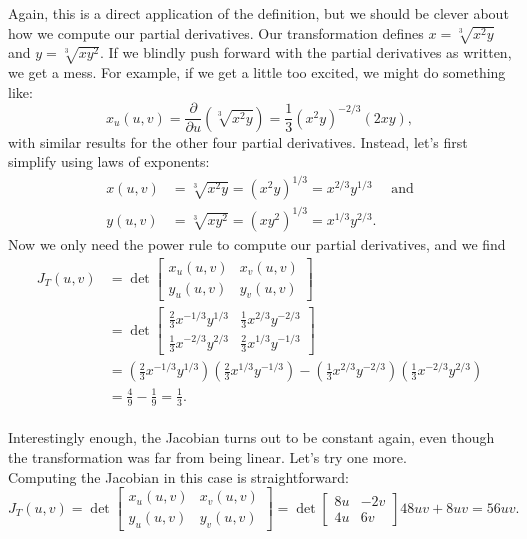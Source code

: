 {Again, this is a direct application of the definition, but we should be clever about how we compute our partial derivatives. Our transformation defines $x=\sqrt[3]{x^2y}$ and $y=\sqrt[3]{xy^2}$. If we blindly push forward with the partial derivatives as written, we get a mess. For example, if we get a little too excited, we might do something like:
\[
x_u(u,v) = \frac{\partial}{\partial u}(\sqrt[3]{x^2y}) = \frac{1}{3}(x^2y)^{-2/3}(2xy),
\]
with similar results for the other four partial derivatives. Instead, let's first simplify using laws of exponents:
\begin{align*}
x(u,v) &= \sqrt[3]{x^2y} = (x^2y)^{1/3} = x^{2/3}y^{1/3} \quad\text{ and}\\
y(u,v) &= \sqrt[3]{xy^2} = (xy^2)^{1/3} = x^{1/3}y^{2/3}.
\end{align*}
Now we only need the power rule to compute our partial derivatives, and we find
\begin{align*}
J_T(u,v) &= \det\begin{bmatrix}x_u(u,v)&x_v(u,v)\\y_u(u,v)&y_v(u,v)\end{bmatrix} \\
&= \det\begin{bmatrix}\frac23 x^{-1/3}y^{1/3}& \frac13 x^{2/3}y^{-2/3}\\ \frac13 x^{-2/3}y^{2/3}& \frac23 x^{1/3}y^{-1/3}\end{bmatrix}\\
&= \left(\frac23 x^{-1/3}y^{1/3}\right)\left( \frac23 x^{1/3}y^{-1/3}\right)-\left(\frac13 x^{2/3}y^{-2/3}\right)\left(\frac13 x^{-2/3}y^{2/3}\right)\\
&=\frac49 -\frac19 = \frac13.
\end{align*}
\baselineskip}\\

Interestingly enough, the Jacobian turns out to be constant again, even though the transformation was far from being linear. Let's try one more.\\

{Computing the Jacobian in this case is straightforward:
\[
J_T(u,v) = \det\begin{bmatrix}x_u(u,v)&x_v(u,v)\\y_u(u,v)&y_v(u,v)\end{bmatrix} = \det\begin{bmatrix} 8u&-2v\\4u&6v\end{bmatrix} 48uv+8uv=56uv.
\]
\baselineskip}\\

